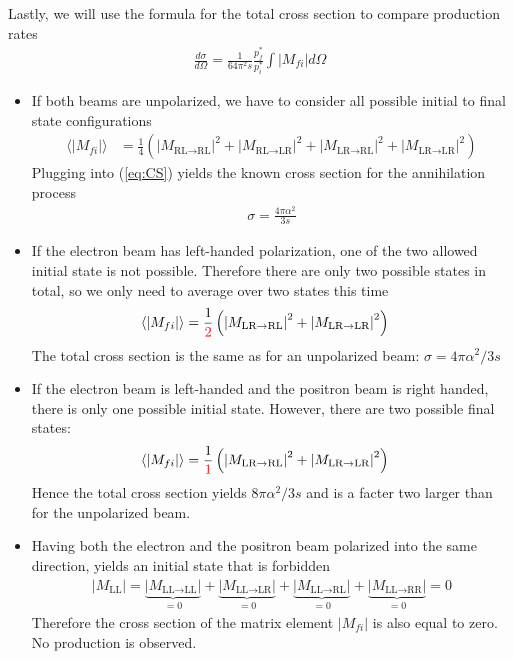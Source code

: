 \documentclass{article}
\begin{document}
Lastly, we will use the formula for the total cross section to compare
production rates
\begin{align}
    \label{eq:CS}
    \frac{d \sigma}{d \Omega} = \frac{1}{64 \pi ^2 s} \frac{p ^{*}_f}{p ^{*}_{i}}
    \int \left| M _{fi} \right| d \Omega
\end{align}
\begin{itemize}
    \item If both beams are unpolarized, we have to consider all possible
	initial to final state configurations
	\begin{align}
	\langle \left| M _{fi} \right| \rangle &=
	\frac{1}{4} \left(
	\left| M _{\text{RL} \rightarrow \text{RL}} \right| ^2 +
	\left| M _{\text{RL} \rightarrow \text{LR}} \right| ^2 +
	\left| M _{\text{LR} \rightarrow \text{RL}} \right| ^2 +
	\left| M _{\text{LR} \rightarrow \text{LR}} \right| ^2
	\right)
    \end{align}
Plugging into (\ref{eq:CS}) yields the known cross section for the annihilation
process
\begin{align}
    \sigma = \frac{4 \pi \alpha ^{2} }{3s}
\end{align}
    \item If the electron beam has left-handed polarization, one of the two
	allowed initial state is not possible. Therefore there are only
	two possible states in total, so we only need to average over two
	states this time
	\begin{align}
	\langle \left| M _{fi} \right| \rangle &=
	\frac{1}{\color{red}{2}} \left(
	\left| M _{\text{LR} \rightarrow \text{RL}} \right| ^2 +
	\left| M _{\text{LR} \rightarrow \text{LR}} \right| ^2
	\right)
	\end{align}
	The total cross section is the same as for an unpolarized beam:
	\( \sigma = 4 \pi \alpha ^{2} / 3 s \)
    \item If the electron beam is left-handed and the positron beam is
	right handed, there is only one possible initial state. However,
	there are two possible final states:	
	\begin{align}
	\langle \left| M _{fi} \right| \rangle &=
	\frac{1}{\color{red}{1}} \left(
	\left| M _{\text{LR} \rightarrow \text{RL}} \right| ^2 +
	\left| M _{\text{LR} \rightarrow \text{LR}} \right| ^2
	\right)
	\end{align}
	Hence the total cross section yields \( 8 \pi \alpha ^2 / 3s \) and is
	a facter two larger than for the unpolarized beam.
    \item Having both the electron and the positron beam polarized into
	the same direction, yields an initial state that is forbidden
	\begin{align}
	    \left| M _{\text{LL}} \right| = 
	    \underbrace{\left| M _{\text{LL}\rightarrow \text{LL}} \right|}_{=0} + 
	    \underbrace{\left| M _{\text{LL}\rightarrow \text{LR}} \right|}_{=0} + 
	    \underbrace{\left| M _{\text{LL}\rightarrow \text{RL}} \right|}_{=0} + 
	    \underbrace{\left| M _{\text{LL}\rightarrow \text{RR}} \right|}_{=0}  
	    = 0
	\end{align}
	Therefore the cross section of the matrix element \( \left| M _{fi} 
	    \right| \) is also equal to zero. No production is observed.
\end{itemize}
\end{document}
